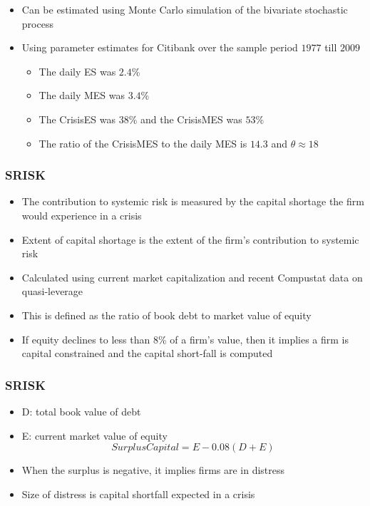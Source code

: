 \documentclass[11pt]{beamer}
\begin{document}
\begin{frame}
\begin{itemize}
\item Can be estimated using Monte Carlo simulation of the bivariate stochastic process
\item Using parameter estimates for Citibank over the sample period $1977$ till $2009$
\begin{itemize}
\item The daily ES was $2.4$\%
\item The daily MES was $3.4$\%
\item The CrisisES was $38$\% and the CrisisMES was $53$\%
\item The ratio of the CrisisMES to the daily MES is $14.3$ and $\theta \approx 18$
\end{itemize}
\end{itemize}
\end{frame}


\begin{frame}
\frametitle{SRISK}
\begin{itemize}
\item The contribution to systemic risk is measured by the capital shortage the firm would  experience in a crisis
\item Extent of capital shortage is the extent of the firm's contribution to systemic risk
\item Calculated using current market capitalization and recent Compustat data on quasi-leverage
\item This is defined as the ratio of book debt to market value of equity
\item If equity declines to less than $8$\% of a firm's value, then it implies a firm is capital constrained and the capital short-fall is computed
\end{itemize}
\end{frame}


\begin{frame}
\frametitle{SRISK}
\begin{itemize}
\item D: total book value of debt
\item E: current market value of equity
\begin{equation}
SurplusCapital = E - 0.08(D + E)
\end{equation}
\item When the surplus is negative, it implies firms are in distress
\item Size of distress is capital shortfall expected in a crisis
\end{itemize}
\end{frame}
\end{document}
